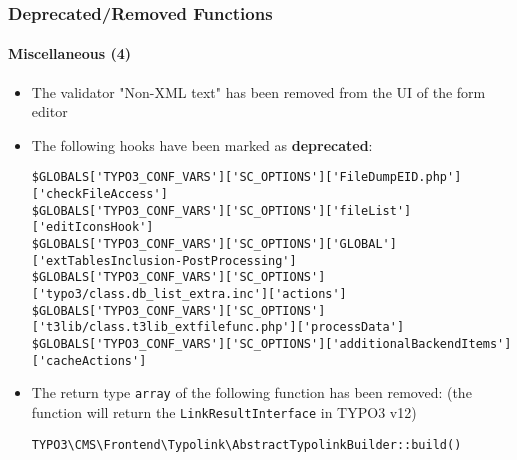 %

\begin{frame}[fragile]
	\frametitle{Deprecated/Removed Functions}
	\framesubtitle{Miscellaneous (4)}


	\begin{itemize}
		\item The validator "Non-XML text" has been removed from the UI of the form editor
		\item The following hooks have been marked as \textbf{deprecated}:
\begin{lstlisting}
$GLOBALS['TYPO3_CONF_VARS']['SC_OPTIONS']['FileDumpEID.php']['checkFileAccess']
$GLOBALS['TYPO3_CONF_VARS']['SC_OPTIONS']['fileList']['editIconsHook']
$GLOBALS['TYPO3_CONF_VARS']['SC_OPTIONS']['GLOBAL']['extTablesInclusion-PostProcessing']
$GLOBALS['TYPO3_CONF_VARS']['SC_OPTIONS']['typo3/class.db_list_extra.inc']['actions']
$GLOBALS['TYPO3_CONF_VARS']['SC_OPTIONS']['t3lib/class.t3lib_extfilefunc.php']['processData']
$GLOBALS['TYPO3_CONF_VARS']['SC_OPTIONS']['additionalBackendItems']['cacheActions']
\end{lstlisting}
		\item The return type \texttt{array} of the following function has been removed:\newline
			\smaller(the function will return the \texttt{LinkResultInterface} in TYPO3 v12)\normalsize
\begin{lstlisting}
TYPO3\CMS\Frontend\Typolink\AbstractTypolinkBuilder::build()
\end{lstlisting}

	\end{itemize}

\end{frame}

